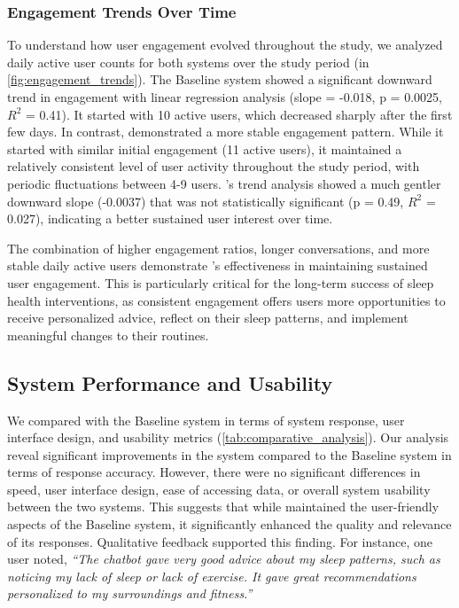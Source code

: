 \subsubsection{Engagement Trends Over Time}
To understand how user engagement evolved throughout the study, we analyzed daily active user counts for both systems over the study period (in \autoref{fig:engagement_trends}). 
The Baseline system showed a significant downward trend in engagement with linear regression analysis (slope = -0.018, p = 0.0025, $R^2$ = 0.41). It started with 10 active users, which decreased sharply after the first few days.
In contrast, \name{} demonstrated a more stable engagement pattern. While it started with similar initial engagement (11 active users), it maintained a relatively consistent level of user activity throughout the study period, with periodic fluctuations between 4-9 users. \name{}'s trend analysis showed a much gentler downward slope (-0.0037) that was not statistically significant (p = 0.49, $R^2$ = 0.027), indicating a better sustained user interest over time.

The combination of higher engagement ratios, longer conversations, and more stable daily active users demonstrate \name{}'s effectiveness in maintaining sustained user engagement. This is particularly critical for the long-term success of sleep health interventions, as consistent engagement offers users more opportunities to receive personalized advice, reflect on their sleep patterns, and implement meaningful changes to their routines.


\subsection{System Performance and Usability}
We compared \name{} with the Baseline system in terms of system response, user interface design, and usability metrics (\autoref{tab:comparative_analysis}). 
Our analysis reveal significant improvements in the \name{} system compared to the Baseline system in terms of response accuracy.  However, there were no significant differences in speed, user interface design, ease of accessing data, or overall system usability between the two systems. This suggests that while \name{} maintained the user-friendly aspects of the Baseline system, it significantly enhanced the quality and relevance of its responses. Qualitative feedback supported this finding. For instance, one user noted, \textit{``The chatbot gave very good advice about my sleep patterns, such as noticing my lack of sleep or lack of exercise. It gave great recommendations personalized to my surroundings and fitness.''}



